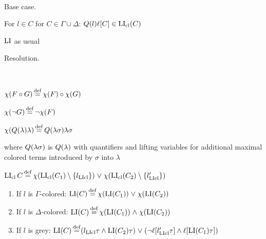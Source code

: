 \documentclass[,%
	draft=false,%
	numbers=noendperiod
	11pt,
	a4paper,
	oneside,%
	openany,
]{memoir}
\begin{document}
\begin{defi}[$\LI$]
	~

	\begin{description}
		\item{} Base case.

			For $l \in C$ for $C \in \Gamma\cup\Delta$:
			$Q(l) \ell[C] \in \operatorname{LI}_{\operatorname{cl}}(C)$

			$\LI$ as usual

		\item{} Resolution.

			\begin{defi}~

				$\chi(F \circ G) \operatorname{\stackrel{\mathrm{def}}{=}} \chi(F) \circ \chi(G)$

				$\chi(\lnot G) \operatorname{\stackrel{\mathrm{def}}{=}} \lnot \chi(F) $

				$\chi(Q(\lambda)\lambda) \operatorname{\stackrel{\mathrm{def}}{=}} Q(\lambda\sigma) \lambda\sigma$

				where $Q(\lambda\sigma)$ is $Q(\lambda)$ with quantifiers and lifting variables for additional maximal colored terms introduced by $\sigma$ into $\lambda$
			\end{defi}

			$\operatorname{LI}_{\operatorname{cl}}{C} \operatorname{\stackrel{\mathrm{def}}{=}}
			\chi(\operatorname{LI}_{\operatorname{cl}}(C_1) \setminus \{l_{\operatorname{LIcl}}\}) 
			\;{\lor}\;
			\chi(\operatorname{LI}_{\operatorname{cl}}(C_2) \setminus \{l'_{\operatorname{LIcl}}\}) 
			$





			\begin{enumerate}

				\item If $l$ is $\Gamma$-colored:
					$\operatorname{LI}(C) \operatorname{\stackrel{\mathrm{def}}{=}} \chi(\operatorname{LI}(C_1))\;{\lor}\; \chi(\operatorname{LI}(C_2)) $

				\item If $l$ is $\Delta$-colored:
					$\operatorname{LI}(C) \operatorname{\stackrel{\mathrm{def}}{=}} \chi(\operatorname{LI}(C_1))\;{\land}\; \chi(\operatorname{LI}(C_2)) $

				\item If $l$ is grey:
					$\operatorname{LI}(C) \operatorname{\stackrel{\mathrm{def}}{=}}
					({l_{\operatorname{LIcl}}\tau} \land {\operatorname{LI}(C_2)\tau}) \;{\lor}\;
					(\lnot \ell[l'_{\operatorname{LIcl}}\tau]\land \ell[\operatorname{LI}(C_1)\tau ])
					$

			\end{enumerate}



	\end{description}
\end{defi}
\end{document}
